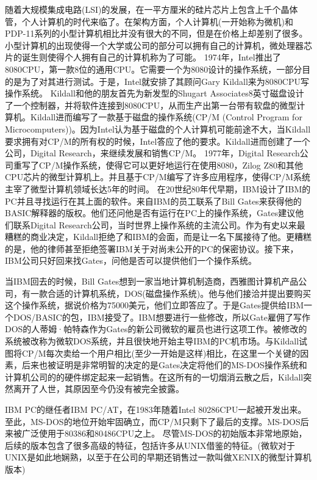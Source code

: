 	随着大规模集成电路(LSI)的发展，在一平方厘米的硅片芯片上包含上千个晶体管，个人计算机的时代来临了。在架构方面，个人计算机(一开始称为微机)和PDP-11系列的小型计算机相比并没有很大的不同，但是在价格上却差别了很多。小型计算机的出现使得一个大学或公司的部分可以拥有自己的计算机，微处理器芯片的诞生则使得个人拥有自己的计算机称为了可能。
	1974年，Intel推出了8080CPU，第一款8位的通用CPU。它需要一个为8080设计的操作系统，一部分目的是为了对其进行测试。于是，Intel就安排了其顾问Gary Kildall来为8080CPU写操作系统。
	Kildall和他的朋友首先为新发型的Shugart Associates8英寸磁盘设计了一个控制器，并将软件连接到8080CPU，从而生产出第一台带有软盘的微型计算机。Kildall进而编写了一款基于磁盘的操作系统(CP/M (Control Program for Microcomputers))。因为Intel认为基于磁盘的个人计算机可能前途不大，当Kildall要求拥有对CP/M的所有权的时候，Intel答应了他的要求。Kildall进而创建了一个公司，Digital Research，来继续发展和销售CP/M。
	1977年，Digital Research公司重写了CP/M操作系统，使得它可以更好地运行在使用8080，Zilog Z80和其他CPU芯片的微型计算机上。并且基于CP/M编写了许多应用程序，使得CP/M系统主宰了微型计算机领域长达5年的时间。
	在20世纪80年代早期，IBM设计了IBM的PC并且寻找运行在其上面的软件。来自IBM的员工联系了Bill Gates来获得他的BASIC解释器的版权。他们还问他是否有运行在PC上的操作系统，Gates建议他们联系Digital Research公司，当时世界上操作系统的主流公司。作为有史以来最糟糕的商业决定，Kildall拒绝了和IBM的会面，而是让一名下属接待了他。更糟糕的是，他的律师甚至拒绝签署IBM关于对尚未公开的PC的保密协议。接下来，IBM公司只好回来找Gates，问他是否可以提供他们一个操作系统。
	
	当IBM回去的时候，Bill Gates想到一家当地计算机制造商，西雅图计算机产品公司，有一款合适的计算机系统，DOS(磁盘操作系统)。他与他们接洽并提出要购买这个操作系统，据说价格为75000美元，他们立即答应了。于是Gates提供给IBM一个DOS/BASIC的包，IBM接受了。IBM想要进行一些修改，所以Gate雇佣了写作DOS的人蒂姆·帕特森作为Gates的新公司微软的雇员也进行这项工作。被修改的系统被改称为微软DOS系统，并且很快地开始主导IBM的PC机市场。与Kildall试图将CP/M每次卖给一个用户相比(至少一开始是这样)相比，在这里一个关键的因素，后来也被证明是非常明智的决定的是Gates决定将他们的MS-DOS操作系统和计算机公司的的硬件绑定起来一起销售。在这所有的一切烟消云散之后，Kildall突然离开了人世，其原因至今仍没有被完全披露。
	
	IBM PC的继任者IBM PC/AT，在1983年随着Intel 80286CPU一起被开发出来。至此，MS-DOS的地位开始牢固确立，而CP/M只剩下了最后的支撑。MS-DOS后来被广泛使用于80386和80486CPU之上。
	尽管MS-DOS的初始版本非常地原始，后续的版本包含了很多高级的特征，包括许多从UNIX借鉴的特征。(微软对于UNIX是如此地娴熟，以至于在公司的早期还销售过一款叫做XENIX的微型计算机版本)
	
